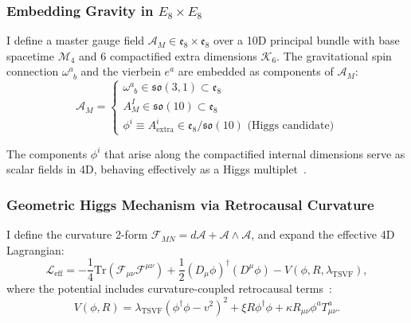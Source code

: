 \documentclass[twocolumn,superscriptaddress,floatfix]{revtex4-2}
\begin{document}
\subsubsection{Embedding Gravity in \(E_8 \times E_8\)}
\label{subsubsec:E8_embedding}

I define a master gauge field \(\mathcal{A}_M \in \mathfrak{e}_8 \times \mathfrak{e}_8\) over a 10D principal bundle with base spacetime \(\mathcal{M}_4\) and 6 compactified extra dimensions \(\mathcal{K}_6\). The gravitational spin connection \(\omega^a_{\phantom{a}b}\) and the vierbein \(e^a\) are embedded as components of \(\mathcal{A}_M\):
\begin{equation}
    \mathcal{A}_M = \begin{cases}
        \omega^a_{\phantom{a}b} \in \mathfrak{so}(3,1) \subset \mathfrak{e}_8 \\
        A^I_M \in \mathfrak{so}(10) \subset \mathfrak{e}_8 \\
        \phi^i \equiv A^i_{\text{extra}} \in \mathfrak{e}_8 / \mathfrak{so}(10) \text{ (Higgs candidate)}
    \end{cases}
    \label{eq:E8gaugefield}
\end{equation}

The components \(\phi^i\) that arise along the compactified internal dimensions serve as scalar fields in 4D, behaving effectively as a Higgs multiplet~\cite{Kaplan1984, Forgacs1980}.

\subsubsection{Geometric Higgs Mechanism via Retrocausal Curvature}
\label{subsubsec:E8_higgs_mech}

I define the curvature 2-form \(\mathcal{F}_{MN} = d\mathcal{A} + \mathcal{A} \wedge \mathcal{A}\), and expand the effective 4D Lagrangian:
\begin{equation}
\mathcal{L}_{\text{eff}} = -\frac{1}{4} \text{Tr}(\mathcal{F}_{\mu\nu} \mathcal{F}^{\mu\nu}) + \frac{1}{2} (D_\mu \phi)^\dagger (D^\mu \phi) - V(\phi, R, \lambda_{\text{TSVF}}),
\label{eq:E8lagrangian}
\end{equation}
where the potential includes curvature-coupled retrocausal terms~\cite{Shaposhnikov2009, Rubakov2001}:
\begin{equation}
V(\phi, R) = \lambda_{\text{TSVF}} (\phi^\dagger \phi - v^2)^2 + \xi R \phi^\dagger \phi + \kappa R_{\mu\nu} \phi^a T^a_{\mu\nu}.
\label{eq:curvatureHiggs}
\end{equation}
\end{document}
